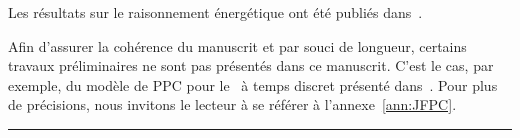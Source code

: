 \begin{center}
\begin{minipage}{\textwidth}
{      Les résultats sur le raisonnement énergétique ont été publiés
      dans~\cite{Nattaf_CPDP,Nattaf_Constraints,Nattaf_ORSpectrum}.

      Afin d'assurer la cohérence du manuscrit et par souci de
      longueur, certains travaux préliminaires ne sont pas présentés
      dans ce manuscrit. C'est le cas, par exemple, du modèle de PPC
      pour le \CECSP~à temps discret présenté
      dans~\cite{Nattaf_JFPC}. Pour plus de précisions, nous invitons
      le lecteur à se référer à l'annexe~\ref{ann:JFPC}.
 }
    \vspace{0.5cm}
    \hrule
  \end{minipage}
\end{center}



%
\clearemptydoublepage%

%
\clearemptydoublepage%
